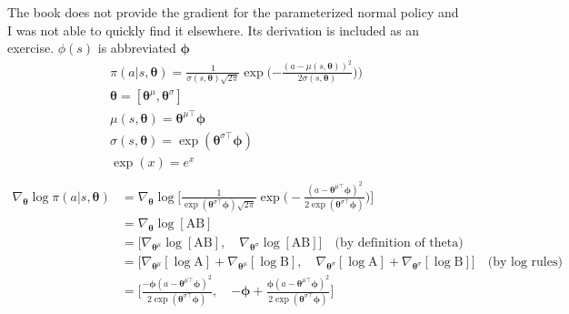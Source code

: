 \documentclass{article}
\newcommand{\grad}[1]{\nabla_{#1}}
\newcommand{\thetab}{\bm{\theta}}
\newcommand{\phib}{\bm{\phi}}
\begin{document}
The book does not provide the gradient for the parameterized normal policy and I was not able to quickly find it elsewhere. Its derivation is included as an exercise. $\phi(s)$ is abbreviated $\phib$
\begin{gather*}
\pi (a | s, \thetab) =  \frac{1}{\sigma(s, \thetab)\sqrt{2\pi}}\exp\bigg({-\frac{(a - \mu(s, {\thetab}))^2}{2\sigma(s, \thetab)})}\bigg)\\
\thetab = [\thetab^\mu, \thetab^\sigma] \\
\mu(s, \thetab) = \thetab^{\mu\top}\phib\\
\sigma(s, \thetab) = \exp(\thetab^{\sigma\top}\phib)\\
\exp(x) = e^x\\
\end{gather*}
\begin{align*}
\grad{\thetab} \log\pi (a | s, \thetab) &= \grad{\thetab} \log \bigg[ \frac{1}{\exp(\thetab^
	{\sigma\top}\phib)\sqrt{2\pi}}\exp\bigg(- \frac{(a - \thetab^{\mu\top}\phib)^2}{2\exp(\thetab^{\sigma\top}\phib)}\bigg)\bigg]\\
&= \grad{\thetab}\log[\text{AB}] \\
&= \big[\grad{\thetab^\mu} \log[\text{AB}],\quad\grad{\thetab^\sigma}\log[\text{AB}]\big]  \quad\text{(by definition of theta)}\\
&= \big[\grad{\thetab^\mu}[\log\text{A}]+ \grad{\thetab^\mu}[\log\text{B}],\quad \grad{\thetab^\sigma}[\log\text{A}]+ \grad{\thetab^\sigma}[\log\text{B}]\big]  \quad\text{(by log rules)}\\
&= \bigg[\frac{{-\phib} (a - \thetab^{\mu\top}\phib)^2}{2\exp(\thetab^{\sigma\top}\phib)}  ,\quad {-\phib} + \frac{{\phib} (a - \thetab^{\mu\top}\phib)^2}{2\exp(\thetab^{\sigma\top}\phib)} \bigg] \\
 \\
\end{align*}
\end{document}
